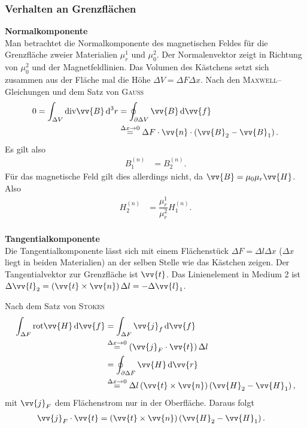 \documentclass[a4paper,12pt]{article}
\newcommand{\td}{\,\text{d}}
\numberwithin{equation}{section}
\begin{document}
\subsubsection{Verhalten an Grenzflächen}
\textbf{Normalkomponente}\\ 
Man betrachtet die Normalkomponente des magnetischen Feldes für die Grenzfläche zweier Materialien $\mu _r^1$ und $\mu _0^2$. Der Normalenvektor zeigt in Richtung von $\mu _0^2$ und der Magnetfeldlinien. Das Volumen des Kästchens setzt sich zusammen aus der Fläche mal die Höhe $\Delta V=\Delta F\Delta x$. Nach den \textsc{Maxwell}--Gleichungen und dem Satz von \textsc{Gauss}
\begin{align} 
        0=\int_{\Delta V}^{}\text{div}\vv{B}\td ^3r&=\oint_{\partial \Delta V}^{}\vv{B}\td \vv{f}\\
                                                   &\stackrel{\Delta x\rightarrow 0}{=}\Delta F\cdot \vv{n}\cdot \left(\vv{B}_2-\vv{B}_1\right)
.\end{align} 
Es gilt also 
\begin{align} 
        B_1^{\left(n\right)}&=B_2^{\left(n\right)}
.\end{align} 
Für das magnetische Feld gilt dies allerdings nicht, da $\vv{B}=\mu _0\mu _r\vv{H}$. Also
\begin{align} 
        H_2^{\left(n\right)}&=\dfrac{\mu _r^1}{\mu _r^2}H_1^{\left(n\right)}
.\end{align} 
\hfill\\\textbf{Tangentialkomponente}\\ 
Die Tangentialkomponente lässt sich mit einem Flächenstück $\Delta F=\Delta l\Delta x$ ($\Delta x$ liegt in beiden Materialien) an der selben Stelle wie das Kästchen zeigen. 
Der Tangentialvektor zur Grenzfläche ist $\vv{t}$.
Das Linienelement in Medium 2 ist $\Delta \vv{l}_2=\left(\vv{t}\times \vv{n}\right)\Delta l=-\Delta \vv{l}_1$.\par
Nach dem Satz von \textsc{Stokes}
\begin{align} 
        \int_{\Delta F}^{}\text{rot}\vv{H}\td \vv{f}&=\int_{\Delta F}^{}\vv{j}_f\td \vv{f}\\
                                                    &\stackrel{\Delta x\rightarrow 0}{=}\left(\vv{j}_F\cdot \vv{t}\right)\Delta l\\
                                                    &=\oint_{\partial \Delta F}^{}\vv{H}\td \vv{r}\\
                                                    &\stackrel{\Delta x\rightarrow 0}{=}\Delta l\left(\vv{t}\times \vv{n}\right)\left(\vv{H}_2-\vv{H}_1\right)
,\end{align} 
mit $\vv{j}_F$ dem Flächenstrom nur in der Oberfläche. Daraus folgt
\begin{align} 
        \vv{j}_F\cdot \vv{t}&=\left(\vv{t}\times \vv{n}\right)\left(\vv{H}_2-\vv{H}_1\right)
.\end{align} 
\end{document}
